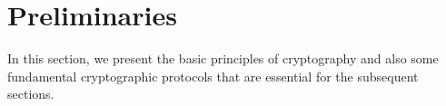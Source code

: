 \chapter{Preliminaries}\label{c:preliminaries}
In this section, we present the basic principles of cryptography and also some fundamental cryptographic protocols that are essential for the subsequent sections.







